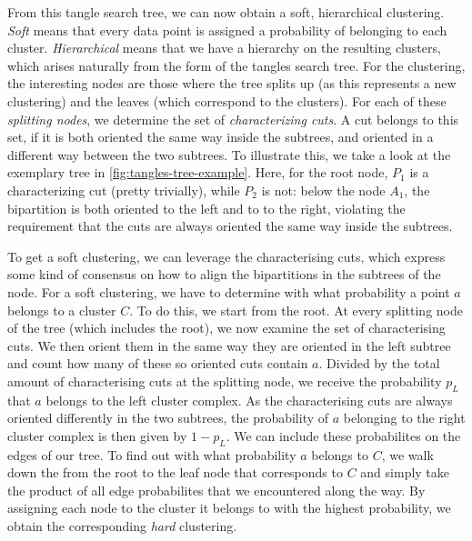 From this tangle search tree, we can now obtain a soft, hierarchical clustering. \textit{Soft} means that every data point is assigned
a probability of belonging to each cluster. \textit{Hierarchical} means that we have a hierarchy on the resulting clusters, which arises naturally
from the form of the tangles search tree. For the clustering, the interesting nodes are those
where the tree splits up (as this represents a new clustering) and the leaves (which correspond to the clusters). 
For each of these \textit{splitting nodes}, we determine the set of \textit{characterizing cuts}.
A cut belongs to this set, if it is both oriented the same way inside the subtrees, and oriented in a different way between the two subtrees.
To illustrate this, we take a look at the exemplary tree in \autoref{fig:tangles-tree-example}. Here, for the root node, $P_1$ is a characterizing cut (pretty trivially),
while $P_2$ is not: below the node $A_1$, the bipartition is both oriented to the left and to to the right, violating the requirement that the cuts are always oriented
the same way inside the subtrees. 

To get a soft clustering, we can leverage the characterising cuts, which express some kind of consensus on how to align the bipartitions in the subtrees of the node. 
For a soft clustering, we have to determine with what probability a point $a$ belongs to a cluster $C$. 
To do this, we start from the root. At every splitting node of the tree (which includes the root), we now examine the set of characterising cuts.
We then orient them in the same way they are oriented in the left subtree and count how many of these so oriented cuts contain $a$. Divided by the total amount of characterising cuts at the
splitting node, we receive the probability $p_L$ that $a$ belongs to the left cluster complex. As the characterising cuts are always oriented differently in the two subtrees, the probability
of $a$ belonging to the right cluster complex is then given by $1 - p_L$. We can include these probabilites on the edges of our tree. 
To find out with what probability $a$ belongs to $C$, we
walk down the from the root to the leaf node that corresponds to $C$ and simply take the product of all edge probabilites that we encountered along the way.
By assigning each node to the cluster it belongs to with the highest probability, we obtain the corresponding \textit{hard} clustering.
    


